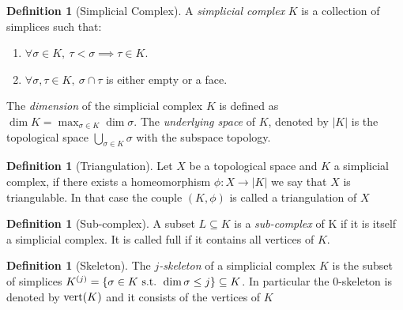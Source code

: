 \documentclass{article}
\newcommand{\vertices}{\textmd{vert}}
\newcommand{\st}{\textmd{ s.t. }}
\theoremstyle{plain}
\theoremstyle{definition}
\newtheorem{definition}[thm]{Definition}
\theoremstyle{remark}
\begin{document}
\begin{definition}[Simplicial Complex]
A \emph{simplicial complex} $K$ is a collection of simplices such that:
\begin{enumerate}[label=(S\arabic*)]
	\item $ \forall \sigma \in K, \ \tau < \sigma \implies \tau \in K $. 
	\item $ \forall \sigma,\tau \in K, \ \sigma \cap \tau $ is either empty or a face.
\end{enumerate}
The \emph{dimension} of the simplicial complex $K$ is defined as $ \dim K = \max_{\sigma \in K} \dim \sigma $.
	The \emph{underlying space} of $K$, denoted by $|K|$ is the topological space $ \bigcup_{\sigma \in K} \sigma $ with the subspace topology.
	\end{definition}
\begin{definition}[Triangulation]
	Let $X$ be a topological space and $K$ a simplicial complex, if there exists a homeomorphism $ \phi : X \to |K| $ we say that $X$ is triangulable. In that case the couple $ (K,\phi) $ is called a triangulation of $X$
\end{definition}

	\begin{definition}[Sub-complex]
		A subset $L \subseteq K$ is a \emph{sub-complex} of K if it is itself a simplicial complex. It is called full if it contains all vertices of $K$.
	\end{definition}
	
	\begin{definition}[Skeleton]
		The \emph{$j$-skeleton} of a simplicial complex $K$ is the subset of simplices $K^{(j)}= \{ \sigma \in K \st \dim\sigma \leq j \} \subseteq K $. In particular the 0-skeleton is denoted by $\vertices(K)$ and it consists of the vertices of $K$
	\end{definition}
	
\end{document}
